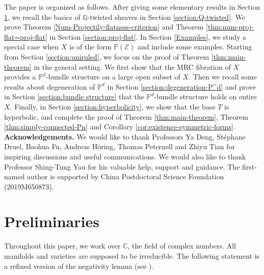 \documentclass[english,reqno]{amsart}
\newcommand\bbP{{\mathbb P}}
\newcommand\sE{{\mathscr E}}
\theoremstyle{plain}
\theoremstyle{definition}
\numberwithin{equation}{section} %
\begin{document}
The paper is organized as follows. After giving some elementary
results  in Section
\ref{section:pre}, we  recall the basics of $\mathbb{Q}$-twisted
sheaves in Section \ref{section:Q-twisted}. We prove
Theorem \ref{Num-Projectily-flatness-criterion} and Theorem
\ref{thm:num-proj-flat=proj-flat} in Section
\ref{section:proj-flat}. In Section \ref{Examples}, we  study
a  special case when $X$ is of the form
$\mathbb{P}(\sE)$  and  include some examples. Starting from Section
\ref{section:uniruled}, we  focus on the proof of Theorem
\ref{thm:main-theorem} in the general setting. We first show that
the MRC fibration of $X$ provides a $\mathbb{P}^d$-bundle
structure on a large open subset of $X$. Then  we recall some
results about degeneration of $\bbP^d$ in Section
\ref{section:degeneration-P^d} and prove  in Section
\ref{section:bundle structure} that the
$\bbP^d$-bundle structure holds on entire $X$.
 Finally, in Section
\ref{section:hyperbolicity}, we  show that the base $T$ is
hyperbolic, and complete the proof of Theorem \ref{thm:main-theorem}, Theorem \ref{thm:simply-connected-Pn} and Corollary \ref{cor:existence-symmetric-forms}.
 \\



{\bf Acknowledgements.} We would like to thank Professors Ya Deng, St\'ephane Druel, Baohua Fu, Andreas H\"oring, Thomas Peternell and Zhiyu Tian for inspiring discussions and useful communications. We would also like to thank Professor
Shing-Tung Yau for his valuable help, support and guidance.   The first-named author is supported by China Postdoctoral Science Foundation (2019M650873).




\baselineskip

\section{Preliminaries}



\label{section:pre}

Throughout this paper, we work over $\mathbb{C}$, the field of complex numbers.  All manifolds and varieties   are supposed to be irreducible.  The  following statement is a refined version of the negativity lemma (see \cite[Lemma 3.39]{KollarMori1998}).
\end{document}
